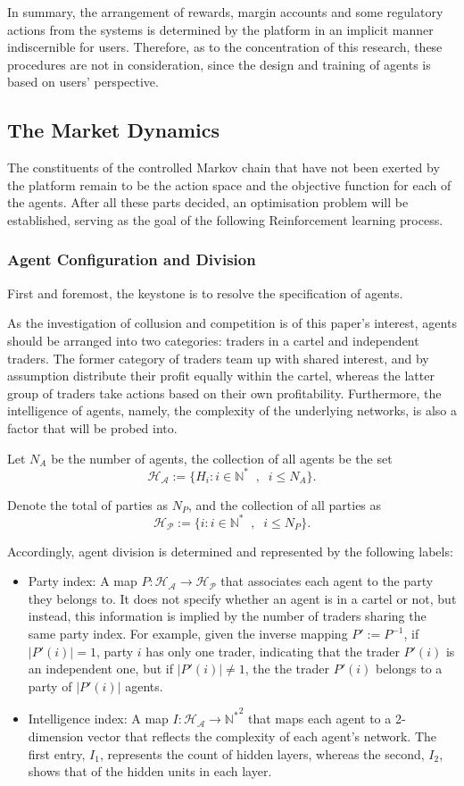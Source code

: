 \documentclass[11pt,twoside]{article}
\numberwithin{Theorem}{section}
\numberwithin{Definition}{section}
\numberwithin{Lemma}{section}
\numberwithin{Algorithm}{section}
\numberwithin{equation}{section}
\begin{document}
In summary, the arrangement of rewards, margin accounts and some regulatory actions from the systems is determined by the platform in an implicit manner indiscernible for users. Therefore, as to the concentration of this research, these procedures are not in consideration, since the design and training of agents is based on users' perspective.
\clearpage

\subsection{The Market Dynamics}
The constituents of the controlled Markov chain that have not been exerted by the platform remain to be the action space and the objective function for each of the agents. After all these parts decided, an optimisation problem will be established, serving as the goal of the following Reinforcement learning process.
\subsubsection{Agent Configuration and Division}
First and foremost, the keystone is to resolve the specification of agents. 

As the investigation of collusion and competition is of this paper's interest, agents should be arranged into two categories: traders in a cartel and independent traders. The former category of traders team up with shared interest, and by assumption distribute their profit equally within the cartel, whereas the latter group of traders take actions based on their own profitability. Furthermore, the intelligence of agents, namely, the complexity of the underlying networks, is also a factor that will be probed into.

Let $N_A$ be the number of agents, the collection of all agents be the set $$\mathcal{H_A}:=\{H_i: i\in\mathbb{N}^*\;\;,\;\;i\leq N_A\}.$$

Denote the total of parties as $N_P$, and the collection of all parties as $$\mathcal{H_P}:=\{i: i\in\mathbb{N}^*\;\;,\;\;i\leq N_P\}.$$ 

Accordingly, agent division is determined and represented by the following labels:
\begin{itemize}
    \item Party index: A map $P:\mathcal{H_A}\rightarrow\mathcal{H_P}$ that associates each agent to the party they belongs to. It does not specify whether an agent is in a cartel or not, but instead, this information is implied by the number of traders sharing the same party index.
    For example, given the inverse mapping $P':=P^{-1}$, if $|P'(i)|=1$, party $i$ has only one trader, indicating that the trader $P'(i)$ is an independent one, but if $|P'(i)|\neq1$, the the trader $P'(i)$ belongs to a party of $|P'(i)|$ agents.
    \item Intelligence index: A map $I:\mathcal{H_A}\rightarrow\mathbb{N^*}^2$ that maps each agent to a 2-dimension vector that reflects the complexity of each agent's network. The first entry, $I_1$, represents the count of hidden layers, whereas the second, $I_2$, shows that of the hidden units in each layer.
\end{itemize}
\end{document}
